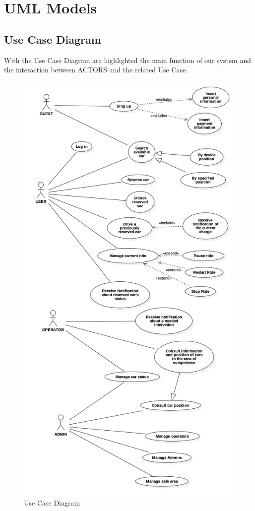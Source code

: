 
\section{UML Models}

\subsection{Use Case Diagram}

With the Use Case Diagram are highlighted the main function of our
system and the interaction between ACTORS and the related Use Case.
\begin{center}
\begin{figure}[H]
\includegraphics[clip,scale=0.15]{UML/png/Model__UseCaseDiagram1_1}

\caption{Use Case Diagram}

\end{figure}
\par\end{center}

